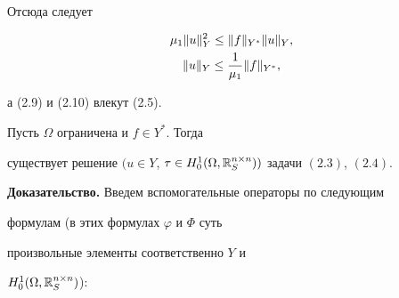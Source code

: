 Отсюда следует


\begin{gather}


\mu_1\|u\|^2_Y\leq\|f\|_{Y^*} \|u\|_Y,\notag \\


\|u\|_Y\leq\frac {1}{\mu_1}\|f\|_{Y^*},


\end{gather}


а (2.9) и (2.10) влекут (2.5).





\begin{thm}


Пусть $\Omega$ ограничена и $f\in Y^*.$ Тогда


существует решение $(u\in Y$, $\tau\in H^1_0(\Omega, \Bbb{R}^{n


\times n }_S))$ задачи $(2.3)$, $(2.4)$.


\end{thm}





{\bf Доказательство.} Введем вспомогательные операторы по следующим


формулам (в этих формулах $ \varphi$ и $\Phi$ суть


произвольные элементы соответственно $Y$ и


$H_0^1(\Omega,\Bbb{R}^{n\times n}_S)$):


